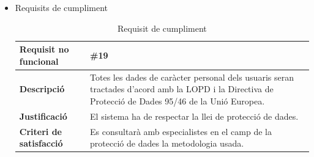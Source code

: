 \begin{itemize}
\item{Requisits de cumpliment}

\begin{table}[!h]
\begin{tabular}{|l|M|}
\hline
\textbf{Requisit no funcional }& \#19  \\ \hline
\textbf{Descripció} & Totes les dades de caràcter personal dels usuaris seran tractades d’acord amb la LOPD i la Directiva de
Protecció de Dades 95/46 de la Unió Europea.\\ \hline
\textbf{Justificació} & El sistema ha de respectar la llei de protecció de dades. \\ \hline
\textbf{Criteri de satisfacció} & Es consultarà amb especialistes en el camp de la protecció de dades la metodologia usada.
\\ \hline
\end{tabular}
\label{}
\caption{Requisit de cumpliment}
\end{table}

\end{itemize}

